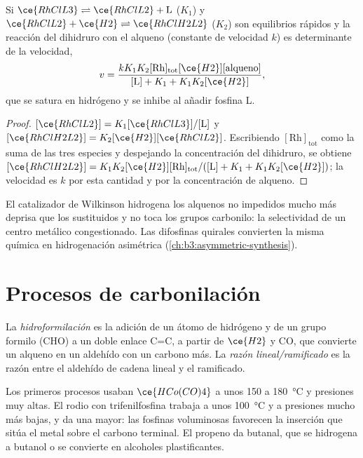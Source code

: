 \begin{proposition}\label{prop:b3:homogeneous-catalysis:wilkinson-rate}
Si $\ce{RhClL3} \rightleftharpoons \ce{RhClL2} + \mathrm L$ ($K_1$) y $\ce{RhClL2} + \ce{H2} \rightleftharpoons \ce{RhClH2L2}$ ($K_2$) son equilibrios
rápidos y la reacción del dihidruro con el alqueno (constante de velocidad $k$)
es determinante de la velocidad,
\[
  v = \frac{kK_1K_2[\mathrm{Rh}]_{\mathrm{tot}}[\ce{H2}][\text{alqueno}]}{[\mathrm L] + K_1 + K_1K_2[\ce{H2}]},
\]
que se satura en hidrógeno y se inhibe al añadir fosfina L.
\end{proposition}

\begin{proof}
$[\ce{RhClL2}] = K_1[\ce{RhClL3}]/[\mathrm L]$ y $[\ce{RhClH2L2}] = K_2[\ce{H2}][\ce{RhClL2}]$. Escribiendo $[\mathrm{Rh}]_{\mathrm{tot}}$ como la
suma de las tres especies y despejando la concentración del dihidruro, se obtiene $[\ce{RhClH2L2}] =
K_1K_2[\ce{H2}][\mathrm{Rh}]_{\mathrm{tot}}/([\mathrm L] + K_1 + K_1K_2[\ce{H2}])$; la velocidad es $k$ por esta cantidad y por la concentración
de alqueno.
\end{proof}

El catalizador de Wilkinson hidrogena los alquenos no impedidos mucho más deprisa que
los sustituidos y no toca los grupos carbonilo: la selectividad de un
centro metálico congestionado. Las difosfinas quirales convierten la misma química en
hidrogenación asimétrica (\cref{ch:b3:asymmetric-synthesis}).

\section{Procesos de carbonilación}

\begin{definition}[Hidroformilación]\label{def:b3:homogeneous-catalysis:hydroformylation}
La \emph{hidroformilación} es la adición de un átomo de hidrógeno
y de un grupo formilo (CHO) a un doble enlace C=C, a partir de $\ce{H2}$ y CO, que convierte un
alqueno en un aldehído con un carbono más. La \emph{razón
lineal/ramificado} es la razón entre el aldehído de cadena
lineal y el ramificado.
\end{definition}

Los primeros procesos usaban $\ce{HCo(CO)4}$ a unos 150 a \qty{180}{\celsius} y presiones muy
altas. El rodio con trifenilfosfina trabaja a unos \qty{100}{\celsius} y a
presiones mucho más bajas, y da una  mayor: las fosfinas
voluminosas favorecen la inserción que sitúa el metal sobre el carbono terminal.
El propeno da butanal, que se hidrogena a butanol o se convierte en alcoholes
plastificantes.


